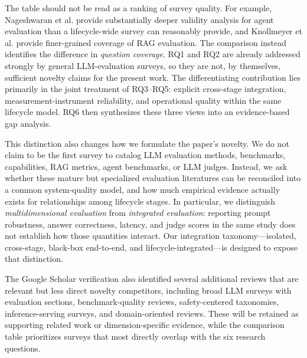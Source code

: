 The table should not be read as a ranking of survey quality. For example, Nageshwaran et al. provide substantially deeper validity analysis for agent evaluation than a lifecycle-wide survey can reasonably provide, and Knollmeyer et al. provide finer-grained coverage of RAG evaluation. The comparison instead identifies the difference in \emph{question coverage}. RQ1 and RQ2 are already addressed strongly by general LLM-evaluation surveys, so they are not, by themselves, sufficient novelty claims for the present work. The differentiating contribution lies primarily in the joint treatment of RQ3--RQ5: explicit cross-stage integration, measurement-instrument reliability, and operational quality within the same lifecycle model. RQ6 then synthesizes these three views into an evidence-based gap analysis.

This distinction also changes how we formulate the paper's novelty. We do not claim to be the first survey to catalog LLM evaluation methods, benchmarks, capabilities, RAG metrics, agent benchmarks, or LLM judges. Instead, we ask whether these mature but specialized evaluation literatures can be reconciled into a common system-quality model, and how much empirical evidence actually exists for relationships among lifecycle stages. In particular, we distinguish \emph{multidimensional evaluation} from \emph{integrated evaluation}: reporting prompt robustness, answer correctness, latency, and judge scores in the same study does not establish how those quantities interact. Our integration taxonomy---isolated, cross-stage, black-box end-to-end, and lifecycle-integrated---is designed to expose that distinction.

The Google Scholar verification also identified several additional reviews that are relevant but less direct novelty competitors, including broad LLM surveys with evaluation sections, benchmark-quality reviews, safety-centered taxonomies, inference-serving surveys, and domain-oriented reviews. These will be retained as supporting related work or dimension-specific evidence, while the comparison table prioritizes surveys that most directly overlap with the six research questions.
